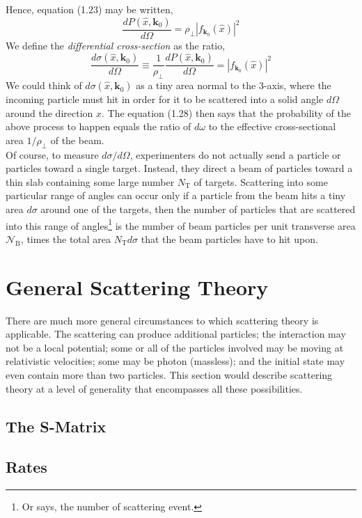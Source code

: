 \documentclass[12pt]{article}
\numberwithin{equation}{section}
\begin{document}
Hence, equation (1.23) may be written,
\begin{equation}
    \frac{dP(\hat{x}, \mathbf{k}_{0})}{d\Omega} = \rho_{\perp}\left|f_{\mathbf{k}_{0}}(\hat{x})\right|^2
\end{equation}
We define the \textit{differential cross-section} as the ratio,
\begin{equation}
    \frac{d\sigma(\hat{x}, \mathbf{k}_{0})}{d\Omega} \equiv \frac{1}{\rho_{\perp}}\frac{dP(\hat{x}, \mathbf{k}_0)}{d\Omega} = \left|f_{\mathbf{k}_0}(\hat{x})\right|^2
\end{equation}
We could think of $d\sigma(\hat{x}, \mathbf{k}_0)$ as a tiny area normal to the 3-axis, where the incoming particle must hit in order for it to be scattered into a solid angle $d\Omega$ around the direction $\hat{x}$.
The equation (1.28) then says that the probability of the above process to happen equals the ratio of $d\omega$ to the effective cross-sectional area $1/\rho_{\perp}$ of the beam.
\\\indent Of course, to measure $d\sigma/d\Omega$, experimenters do not actually send a particle or particles toward a single target. 
Instead, they direct a beam of particles toward a thin slab containing some large number $N_{\text{T}}$ of targets.
Scattering into some particular range of angles can occur only if a particle from the beam hits a tiny area $d\sigma$ around one of the targets, then the number of particles that are scattered into this range of angles\footnote{Or says, the number of scattering event.} is the number of beam particles per unit transverse area $\mathcal{N}_{\text{B}}$, times the total area $N_{\text{T}}d\sigma$ that the beam particles have to hit upon.
\section{General Scattering Theory}
There are much more general circumstances to which scattering theory is applicable.
The scattering can produce additional particles; the interaction may not be a local potential; some or all of the particles involved may be moving at relativistic velocities; some may be photon (massless); and the initial state may even contain more than two particles.
This section would describe scattering theory at a level of generality that encompasses all these possibilities.
\subsection{The S-Matrix}
\subsection{Rates}
\end{document}
